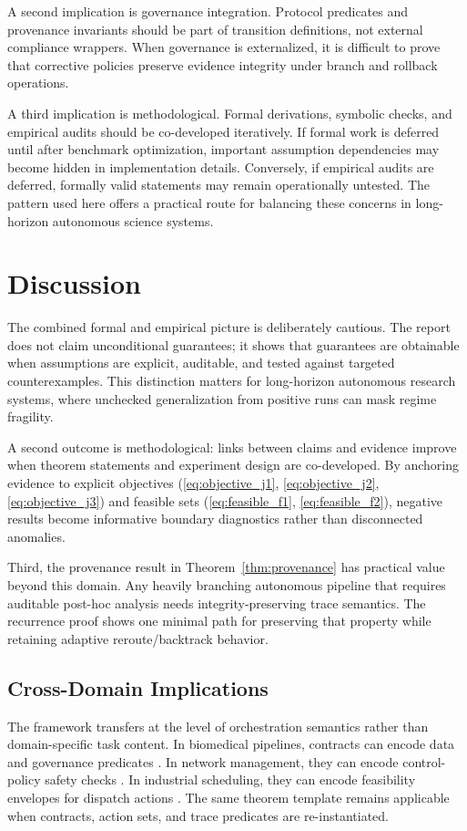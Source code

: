 \documentclass{article} %
\begin{document}
A second implication is governance integration. Protocol predicates and provenance invariants should be part of transition definitions, not external compliance wrappers. When governance is externalized, it is difficult to prove that corrective policies preserve evidence integrity under branch and rollback operations.

A third implication is methodological. Formal derivations, symbolic checks, and empirical audits should be co-developed iteratively. If formal work is deferred until after benchmark optimization, important assumption dependencies may become hidden in implementation details. Conversely, if empirical audits are deferred, formally valid statements may remain operationally untested. The pattern used here offers a practical route for balancing these concerns in long-horizon autonomous science systems.

\section{Discussion}
\label{sec:discussion}
The combined formal and empirical picture is deliberately cautious. The report does not claim unconditional guarantees; it shows that guarantees are obtainable when assumptions are explicit, auditable, and tested against targeted counterexamples. This distinction matters for long-horizon autonomous research systems, where unchecked generalization from positive runs can mask regime fragility.

A second outcome is methodological: links between claims and evidence improve when theorem statements and experiment design are co-developed. By anchoring evidence to explicit objectives (\eqref{eq:objective_j1}, \eqref{eq:objective_j2}, \eqref{eq:objective_j3}) and feasible sets (\eqref{eq:feasible_f1}, \eqref{eq:feasible_f2}), negative results become informative boundary diagnostics rather than disconnected anomalies.

Third, the provenance result in Theorem~\ref{thm:provenance} has practical value beyond this domain. Any heavily branching autonomous pipeline that requires auditable post-hoc analysis needs integrity-preserving trace semantics. The recurrence proof shows one minimal path for preserving that property while retaining adaptive reroute/backtrack behavior.

\subsection{Cross-Domain Implications}
The framework transfers at the level of orchestration semantics rather than domain-specific task content. In biomedical pipelines, contracts can encode data and governance predicates \citep{zhang2025,klang2025}. In network management, they can encode control-policy safety checks \citep{wang2025b,sun2025}. In industrial scheduling, they can encode feasibility envelopes for dispatch actions \citep{wang2025,pajak2025}. The same theorem template remains applicable when contracts, action sets, and trace predicates are re-instantiated.
\end{document}
